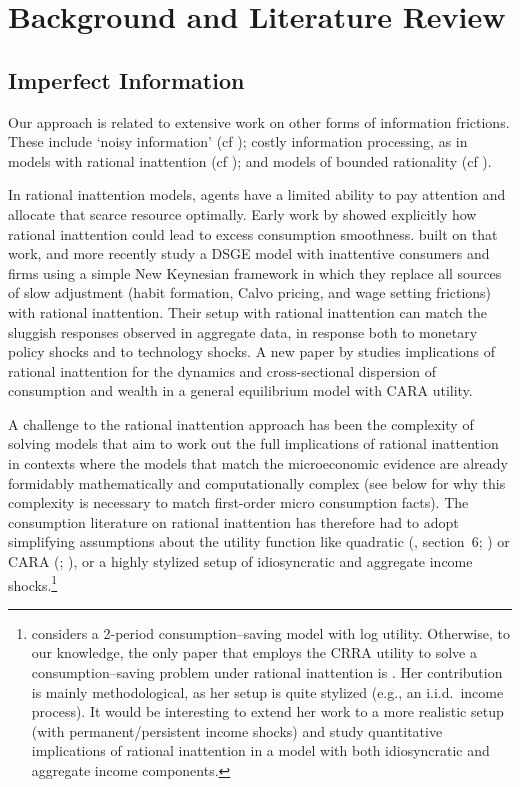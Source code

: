 \hypertarget{Literature}{}
\section{Background and Literature Review}\label{sec:relation}

\hypertarget{Imperfect-Information}{}
\subsection{Imperfect Information}
Our approach is related to extensive work on other forms of information frictions. These include `noisy information' (cf \cite{pischkeMicroMacro}); costly information processing, as in models with rational inattention (cf \cite{simsInattention}); and models of bounded rationality (cf \cite{gabaixSparsityQJE}).

In rational inattention models, agents have a limited ability to pay attention and allocate that scarce resource optimally. Early work by \cite{reis:inattentive} showed explicitly how rational inattention could lead to excess consumption smoothness.
\cite{mw09:RI} built on that work, and more recently \cite{mackWiedREStud15} study a DSGE model with inattentive consumers and firms using a simple New Keynesian framework in which they replace all sources of slow adjustment (habit formation, Calvo pricing, and wage setting frictions) with rational inattention. %
Their setup with rational inattention can match the sluggish responses observed in aggregate data, in response both to monetary policy shocks and to technology shocks. A new paper by \cite{LuoRinGE} studies implications of rational inattention for the dynamics and cross-sectional dispersion of consumption and wealth in a general equilibrium model with CARA utility.

A challenge to the rational inattention approach has been the complexity of solving models that aim to work out the full implications of rational inattention in contexts where the models that match the microeconomic evidence are already formidably mathematically and computationally complex (see below for why this complexity is necessary to match first-order micro consumption facts).  The consumption literature on rational inattention has therefore had to adopt simplifying assumptions about the utility function like quadratic (\cite{simsInattention}, section~6; \cite{luo:inatC}) or CARA (\cite{LuoRinGE}; \cite{reis:inattentive}), or a highly stylized setup of idiosyncratic and aggregate income shocks.\footnote{\cite{sims_beyondLQ} considers a 2-period consumption--saving model with log utility. Otherwise, to our knowledge, the only paper that employs the CRRA utility to solve a consumption--saving problem under rational inattention is \cite{tutino_RIconsumption}. Her contribution is mainly methodological, as her setup is quite stylized (e.g., an i.i.d.\ income process).  It would be interesting to extend her work to a more realistic setup (with permanent/persistent income shocks) and study quantitative implications of rational inattention in a model with both idiosyncratic and aggregate income components.}

